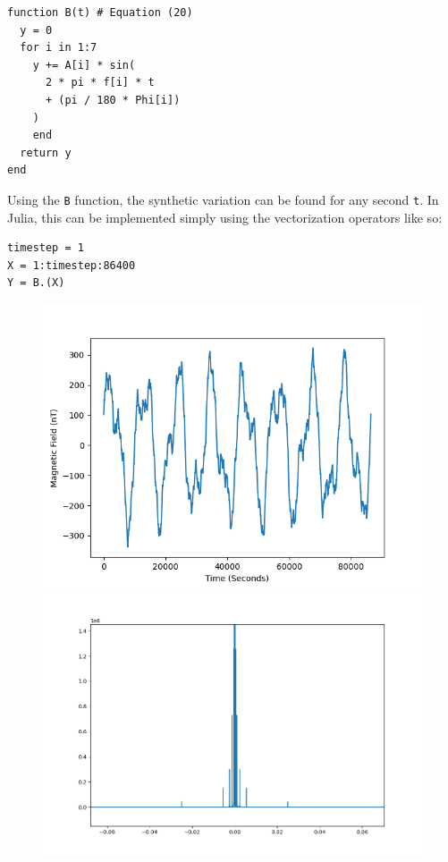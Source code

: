 \documentclass[10pt,a4paper,twoside]{article}
\begin{document}
\begin{multicols}{2}
\begin{lstlisting}
function B(t) # Equation (20)
  y = 0
  for i in 1:7
    y += A[i] * sin(
      2 * pi * f[i] * t 
	  + (pi / 180 * Phi[i])
	)
	end
  return y
end

	\end{lstlisting}
		
	Using the \verb|B| function, the synthetic variation can be found for any second \verb|t|. In Julia, this can be implemented simply using the vectorization operators like so:
	\begin{lstlisting}
timestep = 1
X = 1:timestep:86400
Y = B.(X)
	\end{lstlisting}
		
	\begin{figure}[b!]
		\begin{center}
		    \includegraphics[width=\columnwidth]{Latex/Figure_1.png}
		    \includegraphics[width=\columnwidth]{Latex/Figure_2.png}
		\end{center}


\end{figure}
\end{multicols}
\end{document}
